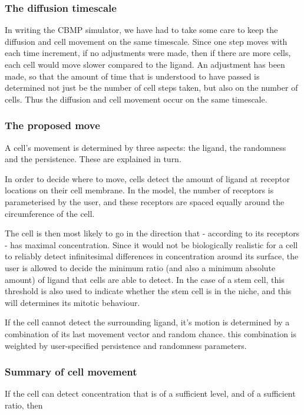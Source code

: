 \documentclass[12pt,a4paper]{report}
\begin{document}
\subsubsection{The diffusion timescale}


In writing the CBMP simulator, we have had to take some care to keep the 
diffusion and cell movement on the same timescale. Since one step moves 
with each time increment, if no adjustments were made, then if there are 
more cells, each cell would move slower compared to the ligand. An 
adjustment has been made, so that the amount of time that is understood 
to have passed is determined not just be the number of cell steps taken, 
but also on the number of cells. Thus the diffusion and cell movement 
occur on the same timescale.



\subsubsection{The proposed move}
A cell's movement is determined by three aspects: the ligand, the 
randomness and the persistence. These are explained in turn.



In order to decide where to move, cells detect the amount of ligand at 
receptor locations on their cell membrane. In the model, the number of 
receptors is parameterised by the user, and these receptors are spaced 
equally around the circumference of the cell. 



The cell is then most likely to go in the direction that - according to 
its receptors - has maximal concentration. Since it would not be 
biologically realistic for a cell to reliably detect infinitesimal 
differences in concentration around its surface, the user is allowed to 
decide the minimum ratio (and also a minimum absolute amount) of ligand 
that cells are able to detect. In the case of a stem cell, this 
threshold is also used to indicate whether the stem cell is in the 
niche, and this will determines its mitotic behaviour.



If the cell cannot detect the surrounding ligand, it's motion is 
determined by a combination of its last movement vector and random 
chance. this combination is weighted by user-specified persistence and 
randomness parameters.



\subsubsection{Summary of cell movement}
If the cell can detect concentration that is of a sufficient level, and 
of a sufficient ratio, then 
\end{document}
